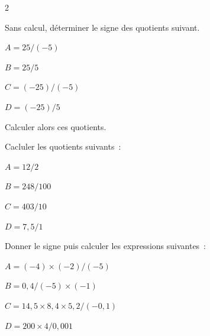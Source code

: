 \begin{multicols}{2}
    \begin{exercice}{}{}
        Sans calcul, déterminer le signe des quotients suivant.
        \begin{enumeratebf}
            \item $A=25 / (-5)$
            \item $B=25 / 5$
            \item $C=(-25) / (-5)$
            \item $D=(-25) / 5$
        \end{enumeratebf}
    Calculer alors ces quotients.
    \end{exercice}

\begin{exercice}{}{}
        Cacluler les quotients suivants~:

    \begin{enumeratebf}
        \item $A=12 / 2$
        \item $B=248 / 100$
        \item $C=403 / 10$
        \item $D=7,5 / 1$
    \end{enumeratebf}
\end{exercice}

\begin{exercice}{}{}
    Donner le signe puis calculer les expressions suivantes~:
    \begin{enumeratebf}
    \item $A=(-4)\times  (-2)/(-5)$
    \item $B=0,4 / (-5)\times  (-1)$
    \item $C=14,5\times  8,4\times  5,2/(-0,1)$
    \item $D=200\times  4/0,001$
    \end{enumeratebf}

\end{exercice}
\end{multicols}